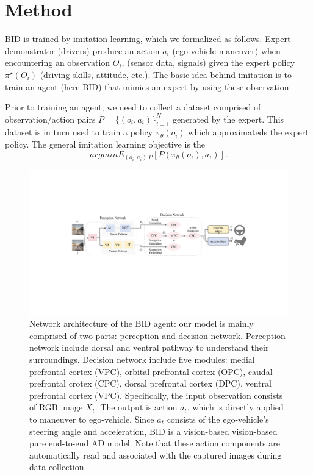 \section{Method}

BID is trained by imitation learning, which we formalized as follows.
Expert demonstrator (drivers) produce an action $a_i$ (ego-vehicle maneuver) when encountering an observation $O_i$, (sensor data, signals) given the expert policy $\pi^{ \star } (O_i)$ (driving skills, attitude, etc.).
The basic idea behind imitation is to train an agent (here BID) that mimics an expert by using these observation.


Prior to training an agent, we need to collect a dataset comprised of observation/action pairs $P= \{ (o_i, a_i) \}_{i=1} ^N $ generated by the expert.
This dataset is in turn used to train a policy $\pi_\theta (o_i)$ which approximateds the expert policy.
The general imitation learning objective is the 
\begin{equation}
	argmin E_{(o_i, a_i) ~ P} [P(\pi_\theta (o_i), a_i )].
\end{equation}

\begin{figure}[t]
	\centering
	\includegraphics[width=\linewidth]{fig/net}
	\caption{Network architecture of the BID agent:
	our model is mainly comprised of two parts: perception and decision network.
	Perception network include dorsal and ventral pathway to understand their surroundings.
	Decision network include five modules: medial prefrontal cortex (VPC), orbital prefrontal cortex (OPC), caudal prefrontal crotex (CPC), dorsal prefrontal cortex (DPC), ventral prefrontal cortex (VPC).
	Specifically, the input observation consists of RGB image $X_t$.
	The output is action $a_t$, which is directly applied to maneuver to ego-vehicle.
	Since $a_t$ consists of the ego-vehicle's steering angle and acceleration, BID is a vision-based vision-based pure end-to-end AD model.
	Note that these action components are automatically read and associated with the captured images during data collection.
	}
	\label{fig:fig2}
\end{figure}
